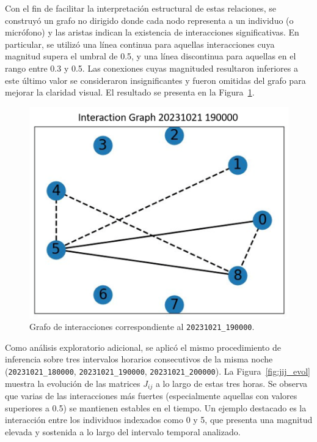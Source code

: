 Con el fin de facilitar la interpretación estructural de estas 
relaciones, se construyó un grafo no dirigido donde cada nodo 
representa a un individuo (o micrófono) y las aristas indican 
la existencia de interacciones significativas. En particular, 
se utilizó una línea continua para aquellas interacciones cuya 
magnitud supera el umbral de 0.5, y una línea discontinua para 
aquellas en el rango entre 0.3 y 0.5. Las conexiones cuyas 
magnituded resultaron inferiores a este último valor se consideraron 
insignificantes y fueron omitidas del grafo para mejorar la 
claridad visual. El resultado se presenta en la 
Figura~\ref{fig:graph}.

\begin{figure}[ht]
    \centering
    \includegraphics[width=0.7\linewidth]{Graphics/corr_graph.png}
    \caption{Grafo de interacciones correspondiente al \texttt{20231021\_190000}.}
    \label{fig:graph}
\end{figure}

Como análisis exploratorio adicional, se aplicó el mismo 
procedimiento de inferencia sobre tres intervalos horarios 
consecutivos de la misma noche (\texttt{20231021\_180000}, \texttt{20231021\_190000}, \texttt{20231021\_200000}). 
La Figura~\ref{fig:jij_evol} 
muestra la evolución de las matrices \( J_{ij} \) a lo largo 
de estas tres horas. Se observa que varias de las interacciones 
más fuertes (especialmente aquellas con valores superiores a 
0.5) se mantienen estables en el tiempo. Un ejemplo destacado es 
la interacción entre los individuos indexados como 0 y 5, que 
presenta una magnitud elevada y sostenida a lo largo del 
intervalo temporal analizado.

